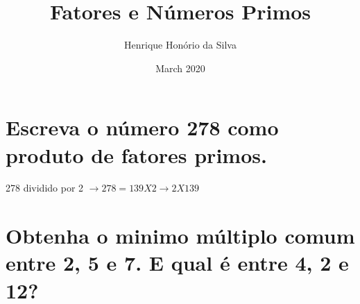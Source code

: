 \documentclass{article}
\title{Fatores e Números Primos}
\author{Henrique Honório da Silva }
\date{March 2020}
\begin{document}
\maketitle

    \section{Escreva o número 278 como produto de fatores primos.}
    \hspace{5mm} 278 dividido por 2 $\rightarrow 278 = 139 X 2 \rightarrow 2 X 139$

    \section{Obtenha o minimo múltiplo comum entre 2, 5 e 7. E qual é entre 4, 2 e 12?}
\end{document}
